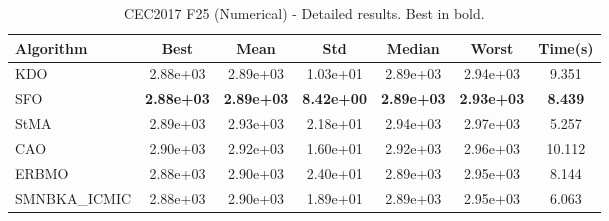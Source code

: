 \begin{table}[H]
\centering\small
\caption{CEC2017 F25 (Numerical) - Detailed results. Best in bold.}
\label{tab:cec2017_F25}
\begin{tabular}{lcccccc}
\toprule
\textbf{Algorithm} & \textbf{Best} & \textbf{Mean} & \textbf{Std} & \textbf{Median} & \textbf{Worst} & \textbf{Time(s)} \\
\midrule
KDO & 2.88e+03 & 2.89e+03 & 1.03e+01 & 2.89e+03 & 2.94e+03 & 9.351 \\
SFO & \textbf{2.88e+03} & \textbf{2.89e+03} & \textbf{8.42e+00} & \textbf{2.89e+03} & \textbf{2.93e+03} & \textbf{8.439} \\
StMA & 2.89e+03 & 2.93e+03 & 2.18e+01 & 2.94e+03 & 2.97e+03 & 5.257 \\
CAO & 2.90e+03 & 2.92e+03 & 1.60e+01 & 2.92e+03 & 2.96e+03 & 10.112 \\
ERBMO & 2.88e+03 & 2.90e+03 & 2.40e+01 & 2.89e+03 & 2.95e+03 & 8.144 \\
SMNBKA_ICMIC & 2.88e+03 & 2.90e+03 & 1.89e+01 & 2.89e+03 & 2.95e+03 & 6.063 \\
\bottomrule
\end{tabular}
\end{table}
